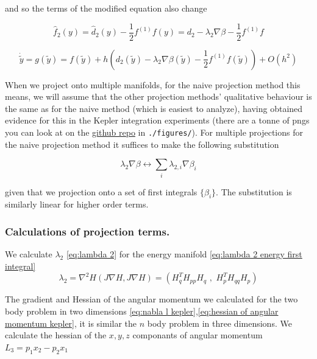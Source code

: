 \documentclass[12pt]{article}
\begin{document}
and so the terms of the modified equation also change 

\begin{equation}\label{eq:modified equation for general projection method f2}
    \hat f_2(y) = \hat d_2(y) - \frac{1}{2} f^{(1)}f(y) = d_2 - \lambda_2\nabla\beta - \frac{1}{2}f^{(1)}f
\end{equation}

\begin{equation}\label{eq:modified equation for general projection method first few terms}
    \dot{\widetilde{y}} = g(\widetilde{y}) = f(\widetilde y) + h\left( d_2(\widetilde y) - \lambda_2\nabla\beta(\widetilde y) - \frac{1}{2}f^{(1)}f(\widetilde y) \right) + O(h^2)
\end{equation}

When we project onto multiple manifolds, for the naive projection method this means, we will assume that the other projection methods' qualitative behaviour is the same as for the naive method (which is easiest to analyze), having obtained evidence for this in the Kepler integration experiments (there are a tonne of pngs you can look at on the \href{https://github.com/dcxSt/numerical_integrators}{github repo} in \texttt{./figures/}). For multiple projections for the naive projection method it suffices to make the following substitution 

$$\lambda_2\nabla\beta \longleftrightarrow \sum_i \lambda_{2,i}\nabla\beta_i$$

given that we projection onto a set of first integrals $\{\beta_i\}$. The substitution is similarly linear for higher order terms. 


\subsubsection{Calculations of projection terms.}

We calculate $\lambda_2$ \eqref{eq:lambda 2} for the energy manifold \eqref{eq:lambda 2 energy first integral}
\begin{equation}\label{eq:lambda 2 energy first integral}
    \lambda_2 = \nabla^2H \left( J\nabla H , J\nabla H \right) = \left( H_q^TH_{pp}H_q \,\,,\,\, H_p^TH_{qq}H_p \right)
\end{equation}

The gradient and Hessian of the angular momentum we calculated for the two body problem in two dimensions \eqref{eq:nabla l kepler},\eqref{eq:hessian of angular momentum kepler}, it is similar the $n$ body problem in three dimensions. We calculate the hessian of the $x,y,z$ componants of angular momentum $L_3 = p_1x_2 - p_2x_1$ 
\end{document}
